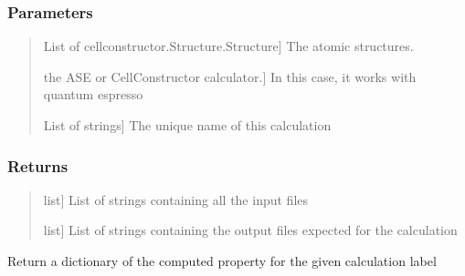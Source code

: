 \documentclass[a4paper,11pt,english]{sphinxmanual}
\begin{document}
\begin{fulllineitems}
\begin{fulllineitems}
\subsubsection{Parameters}
\label{\detokenize{apireference:id60}}\begin{quote}
\begin{description}
\sphinxlineitem{structures}{[}List of cellconstructor.Structure.Structure{]}
\sphinxAtStartPar
The atomic structures.

\sphinxlineitem{calc}{[}the ASE or CellConstructor calculator.{]}
\sphinxAtStartPar
In this case, it works with quantum espresso

\sphinxlineitem{labels}{[}List of strings{]}
\sphinxAtStartPar
The unique name of this calculation

\end{description}
\end{quote}


\subsubsection{Returns}
\label{\detokenize{apireference:id61}}\begin{quote}
\begin{description}
\sphinxlineitem{List\_of\_input}{[}list{]}
\sphinxAtStartPar
List of strings containing all the input files

\sphinxlineitem{List\_of\_output}{[}list{]}
\sphinxAtStartPar
List of strings containing the output files expected
for the calculation

\end{description}
\end{quote}

\end{fulllineitems}


\begin{fulllineitems}
\label{\detokenize{apireference:sscha.Cluster.Cluster.read_results}}
\pysigstartsignatures
{}
\pysigstopsignatures
\sphinxAtStartPar
Return a dictionary of the computed property for the given calculation label

\end{fulllineitems}



\end{fulllineitems}
\end{document}
